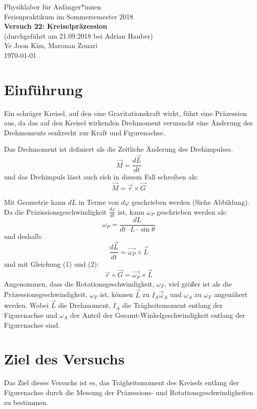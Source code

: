 \documentclass[11pt,a4paper]{article} %
\begin{document}
{
	\centering 
	\large 
	Physiklabor für Anfänger*innen \\
	Ferienpraktikum im Sommersemester 2018 \\[4mm]
	\textbf{\LARGE 
		Versuch 22: Kreiselpräzession
	} \\[3mm]
	(durchgeführt am 21.09.2018 bei Adrian Hauber) \\
	Ye Joon Kim, Marouan Zouari\\
	\today \\[10mm]
}

\section{Einführung}
Ein schräger Kreisel, auf den eine Gravitationskraft wirkt, führt eine Präzession aus, da das auf den Kreisel wirkenden Drehmoment verursacht eine Änderung des Drehmoments senkrecht zur Kraft und Figurenachse.

Das Drehmoment ist definiert als die Zeitliche Änderung des Drehimpulses. 
\begin{equation}
\vec{M} = \frac{d\vec{L}}{dt}
\end{equation}
und das Drehimpuls lässt auch sich in diesem Fall schreiben als:
\begin{equation}
\vec{M} =\vec{r}\times\vec{G}
\end{equation}

Mit Geometrie kann $dL$ in Terme von $d\varphi$ geschrieben werden (Siehe Abbildung). Da die Präzissionsgeschwindigkeit $\frac{d\varphi}{dt}$ ist, kann $\omega_P$ geschrieben werden als:
$$\omega_P = \frac{dL}{dt\cdot L\cdot \sin\theta}$$
und deshalb:
$$\frac{d\vec{L}}{dt} = \vec{\omega_P}\times \vec{L}$$
und mit Gleichung (1) und (2):
$$\vec{r}\times \vec{G} = \vec{\omega_P}\times \vec{L}$$
Angenommen, dass die Rotationsgeschwindigkeit, $\omega_F$, viel größer ist als die Präzessionsgeschwindigkeit, $\omega_P$ ist, können $\vec{L}$ zu $I_A\vec{\omega}_A$ und $\omega_A$ zu $\omega_F$ angenähert werden. Wobei $\vec{L}$ die Drehmoment, $I_A$ die Trägheitsmoment entlang der Figurenachse und $\omega_A$ der Anteil der Gesamt-Winkelgeschwindigkeit entlang der Figurenachse sind. 



\section{Ziel des Versuchs}
Das Ziel dieses Versuchs ist es, das Trägheitsmoment des Kreisels entlang der Figurenachse durch die Messung der Präzessions- und Rotationsgeschwindigkeiten zu bestimmen.
\end{document}
